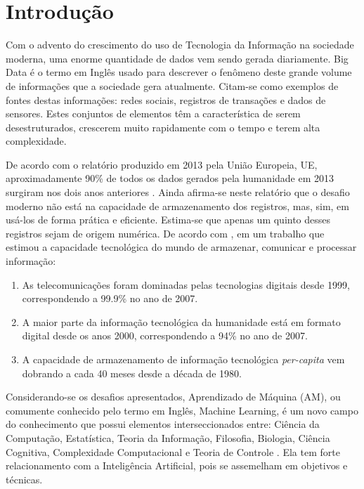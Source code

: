\chapter{Introdução}


Com o advento do crescimento do uso de Tecnologia da Informação na sociedade moderna, uma enorme quantidade de dados vem sendo gerada diariamente. Big Data é o termo em Inglês usado para descrever o fenômeno deste grande volume de informações que a sociedade gera atualmente. Citam-se como exemplos de fontes destas informações: redes sociais, registros de transações e dados de sensores. Estes conjuntos de elementos têm a característica de serem desestruturados, crescerem muito rapidamente com o tempo e terem alta complexidade.

De acordo com o relatório produzido em 2013 pela União Europeia, UE, aproximadamente 90\% de todos os dados gerados pela humanidade em 2013 surgiram nos dois anos anteriores \cite{eu2013}. Ainda afirma-se neste relatório que o desafio moderno não está na capacidade de armazenamento dos registros, mas, sim, em usá-los de forma prática e eficiente. Estima-se que apenas um quinto desses registros sejam de origem numérica. De acordo com , em um trabalho que estimou a capacidade tecnológica do mundo de armazenar, comunicar e processar informação: 

\begin{enumerate}
\item As telecomunicações foram dominadas pelas tecnologias digitais desde 1999, correspondendo a 99.9\% no ano de 2007. 
\item A maior parte da informação tecnológica da humanidade está em formato digital desde os anos 2000, correspondendo a 94\% no ano de 2007.
\item A capacidade de armazenamento de informação tecnológica \textit{per-capita} vem dobrando a cada 40 meses desde a década de 1980.
\end{enumerate}
   

Considerando-se os desafios apresentados, Aprendizado de Máquina (AM), ou comumente conhecido pelo termo em Inglês, Machine Learning, é um novo campo do conhecimento que possui elementos  interseccionados entre: Ciência da Computação, Estatística, Teoria da Informação, Filosofia, Biologia, Ciência Cognitiva, Complexidade Computacional e Teoria de Controle \cite{mitch1997}. Ela tem forte relacionamento  com a Inteligência Artificial, pois se assemelham em objetivos e técnicas. 

